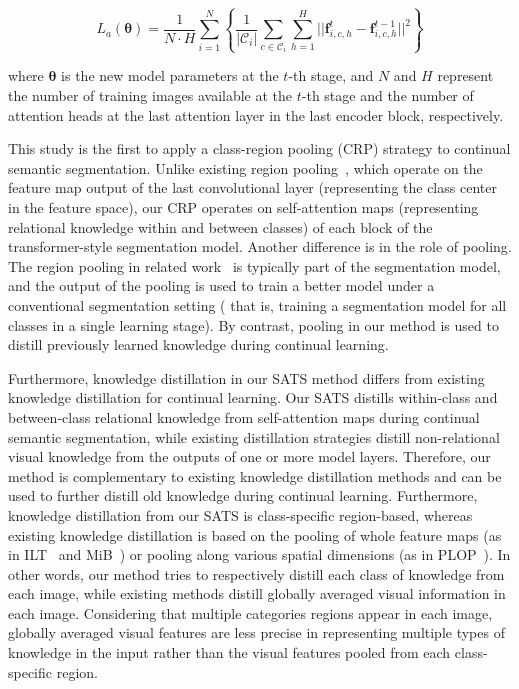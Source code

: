 \documentclass[onecolumn,conference,compsoc]{IEEEtran}
\begin{document}
\begin{spacing}{1.5}
\begin{equation} \label{eq:La}
    L_a(\bm{\theta}) = \frac{1}{N\cdot H} \sum_{i=1}^{N} \left\{ \frac{1}{|\mathcal{C}_i|} \sum_{c\in\mathcal{C}_i}  \sum_{h=1}^{H}  || \mathbf{f}_{i,c,h}^t-\mathbf{f}_{i,c,h}^{t-1}||^2 \right\} 
\end{equation}

\noindent where $\bm{\theta}$ is the new model parameters at the $t$-th stage, and $N$ and $H$ represent the number of training images available at the $t$-th stage and the number of attention heads at the last attention layer in the last encoder block,  {respectively.}

{This study is the} first to apply a class-region pooling (CRP) strategy to continual semantic segmentation.  {Unlike} existing region pooling~\cite{ACFNet, CRP_1, CRP_2}, which  {operate on the} feature map output of the last convolutional layer (representing the class center in the feature space), our CRP operates on self-attention maps (representing relational knowledge within and between classes) of each block of the transformer-style segmentation model. Another difference is in the {role of pooling}. The region pooling in related work~\cite{ACFNet, CRP_1, CRP_2}  is  {typically} part of the segmentation model, and the output of the pooling is used to train a better model under a  {conventional} segmentation setting ( {that is, training} a segmentation model for all classes in a single learning stage).  {By contrast,} pooling in our method is used to distill previously learned knowledge during continual learning.


 {Furthermore,} knowledge distillation in our SATS method  {differs} from existing knowledge distillation for continual learning. Our SATS  {distills} within-class and between-class relational knowledge from self-attention maps during continual semantic segmentation, while existing distillation strategies distill non-relational visual knowledge from the outputs of one or more model layers. Therefore, our method is complementary to existing knowledge distillation methods and can be used to further distill old knowledge during continual learning. Furthermore, knowledge distillation from our SATS is class-specific region-based,  {whereas} existing knowledge distillation is based on the pooling of whole feature maps (as in ILT~\cite{ILT} and MiB~\cite{MiB}) or pooling along various spatial dimensions (as in PLOP~\cite{PLOP}).  In other words, our method tries to respectively distill each class of knowledge from each image, while existing methods distill globally averaged visual information in each image. Considering that multiple categories regions appear in each image, globally averaged visual features are less precise in representing multiple types of knowledge in the input  {rather} than the visual features pooled from each class-specific region.



\end{spacing}
\end{document}
